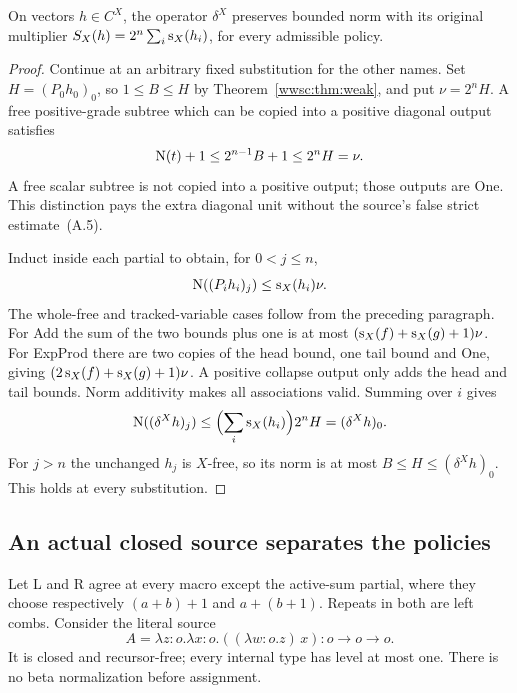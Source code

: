 \begin{theorem}\label{wwsc:thm:norm}
On vectors $h\in C^X$, the operator $\delta^X$ preserves bounded norm with its original
multiplier $S_X(h)=2^n\sum_i\operatorname{s}_X(h_i)$, for every admissible policy.
\end{theorem}
\begin{proof}
Continue at an arbitrary fixed substitution for the other names. Set
$H=(P_0h_0)_0$, so $1\le B\le H$ by Theorem~\ref{wwsc:thm:weak}, and
put $\nu=2^nH$. A free positive-grade subtree which can be copied into
a positive diagonal output satisfies
\[
 \operatorname{N}(t)+1\le2^{n-1}B+1\le2^nH=\nu.
\]
A free scalar subtree is not copied into a positive output; those
outputs are One. This distinction pays the extra diagonal unit without
the source's false strict estimate~(A.5).

Induct inside each partial to obtain, for $0<j\le n$,
\[
 \operatorname{N}((P_i h_i)_j)\le\operatorname{s}_X(h_i)\nu.
\]
The whole-free and tracked-variable cases follow from the preceding
paragraph. For Add the sum of the two bounds plus one is at most
$(\operatorname{s}_X(f)+\operatorname{s}_X(g)+1)\nu$. For ExpProd there are two copies of the
head bound, one tail bound and One, giving
$(2\operatorname{s}_X(f)+\operatorname{s}_X(g)+1)\nu$. A positive collapse output only adds
the head and tail bounds. Norm additivity makes all associations valid.
Summing over $i$ gives
\[
 \operatorname{N}((\delta^Xh)_j)\le\Bigl(\sum_i\operatorname{s}_X(h_i)\Bigr)2^nH
                      =(\delta^Xh)_0.
\]
For $j>n$ the unchanged $h_j$ is $X$-free, so its norm is at most
$B\le H\le(\delta^Xh)_0$. This holds at every substitution.
\end{proof}

\subsection{An actual closed source separates the policies}\label{wwsc:sec:witness}

Let L and R agree at every macro except the active-sum partial, where
they choose respectively $(a+b)+1$ and $a+(b+1)$. Repeats in both
are left combs. Consider the literal source
\[
 A=\lambda z:o.\lambda x:o.((\lambda w:o.z)\,x)
                  :o\to o\to o.
\]
It is closed and recursor-free; every internal type has level at most
one. There is no beta normalization before assignment.

